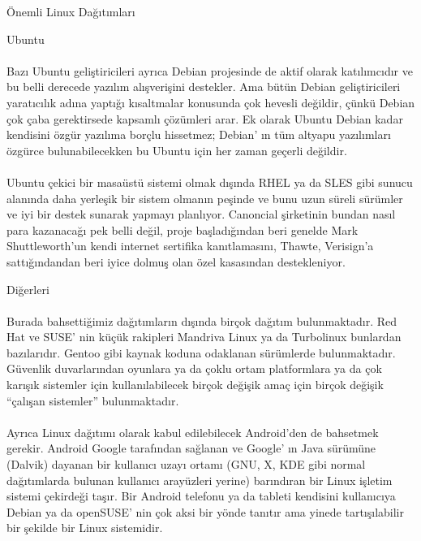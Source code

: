 \documentclass[10pt,a5paper]{book}
\begin{document}
\begin{section}{Önemli Linux Dağıtımları}
\begin{subsection}{Ubuntu}
\paragraph{}{Bazı Ubuntu geliştiricileri ayrıca Debian projesinde de aktif olarak katılımcıdır ve bu belli derecede yazılım alışverişini destekler. Ama bütün Debian geliştiricileri yaratıcılık adına yaptığı kısaltmalar konusunda çok hevesli değildir, çünkü Debian çok çaba gerektirsede kapsamlı çözümleri arar. Ek olarak Ubuntu Debian kadar kendisini özgür yazılıma borçlu hissetmez; Debian' ın tüm altyapu yazılımları özgürce bulunabilecekken bu Ubuntu için her zaman geçerli değildir.}
\paragraph{}{Ubuntu çekici bir masaüstü sistemi olmak dışında RHEL ya da SLES gibi sunucu alanında daha yerleşik bir sistem olmanın peşinde ve bunu uzun süreli sürümler ve iyi bir destek sunarak yapmayı planlıyor. Canoncial şirketinin bundan nasıl para kazanacağı pek belli değil, proje başladığından beri genelde Mark Shuttleworth'un kendi internet sertifika kanıtlamasını, Thawte, Verisign'a sattığındandan beri iyice dolmuş olan özel kasasından destekleniyor.}
\end{subsection}
\begin{subsection}{Diğerleri}
\paragraph{}{Burada bahsettiğimiz dağıtımların dışında birçok dağıtım bulunmaktadır. Red Hat ve SUSE' nin küçük rakipleri Mandriva Linux ya da Turbolinux bunlardan bazılarıdır. Gentoo gibi kaynak koduna odaklanan sürümlerde bulunmaktadır. Güvenlik duvarlarından oyunlara ya da çoklu ortam platformlara ya da çok karışık sistemler için kullanılabilecek birçok değişik amaç için birçok değişik “çalışan sistemler” bulunmaktadır.}
\paragraph{}{Ayrıca Linux dağıtımı olarak kabul edilebilecek Android'den de bahsetmek gerekir. Android Google tarafından sağlanan ve Google' ın Java sürümüne (Dalvik) dayanan bir kullanıcı uzayı ortamı (GNU, X, KDE gibi normal dağıtımlarda bulunan kullanıcı arayüzleri yerine) barındıran bir Linux işletim sistemi çekirdeği taşır. Bir Android telefonu ya da tableti kendisini kullanıcıya Debian ya da openSUSE' nin çok aksi bir yönde tanıtır ama yinede tartışılabilir bir şekilde bir Linux sistemidir.}

\end{subsection}
\end{section}
\end{document}
